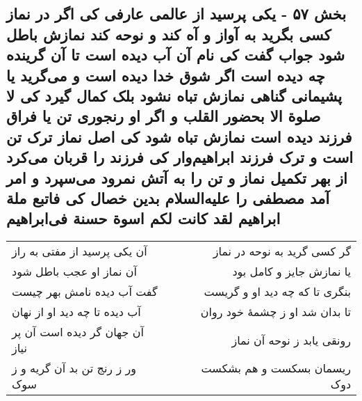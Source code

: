 \begin{center}
\section*{بخش ۵۷ - یکی پرسید از عالمی عارفی کی اگر در نماز کسی بگرید به آواز و آه کند و نوحه کند نمازش باطل شود جواب گفت کی نام آن آب دیده است تا آن گرینده چه دیده است اگر شوق خدا دیده است و می‌گرید یا پشیمانی گناهی نمازش تباه نشود بلک کمال گیرد کی لا صلوة الا بحضور القلب و اگر او رنجوری تن یا فراق فرزند دیده است نمازش تباه شود کی اصل نماز ترک تن است و ترک فرزند ابراهیم‌وار کی فرزند را قربان می‌کرد از بهر تکمیل نماز و تن را به آتش نمرود می‌سپرد و امر آمد مصطفی را علیه‌السلام  بدین خصال کی فاتبع ملة ابراهیم لقد کانت لکم اسوة حسنة فی‌ابراهیم}
\label{sec:sh057}
\begin{longtable}{l p{0.5cm} r}
آن یکی پرسید از مفتی به راز
&&
گر کسی گرید به نوحه در نماز
\\
آن نماز او عجب باطل شود
&&
یا نمازش جایز و کامل بود
\\
گفت آب دیده نامش بهر چیست
&&
بنگری تا که چه دید او و گریست
\\
آب دیده تا چه دید او از نهان
&&
تا بدان شد او ز چشمهٔ خود روان
\\
آن جهان گر دیده است آن پر نیاز
&&
رونقی یابد ز نوحه آن نماز
\\
ور ز رنج تن بد آن گریه و ز سوک
&&
ریسمان بسکست و هم بشکست دوک
\\
\end{longtable}
\end{center}
